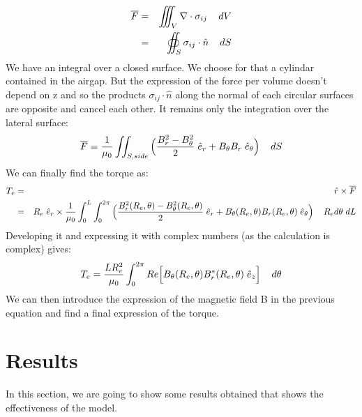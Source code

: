 \begin{eqnarray*}
\overline{F} &=& \iiint_V \nabla \cdot \sigma_{ij} \hspace{4mm} dV\\
 &=& \oiint_S \sigma_{ij} \cdot \hat{n} \hspace{4mm} dS
\end{eqnarray*}
We have an integral over a closed surface. We choose for that a cylindar contained in the airgap. But the expression of the force per volume doesn't depend on z and so the products $\sigma_{ij} \cdot \hat{n}$ along the normal of each circular surfaces are opposite and cancel each other. It remains only the integration over the lateral surface:
\[
    \overline{F} = \frac{1}{\mu_0} \iint_{S,side} \Big(\frac{B_{r}^{2}-B_{\theta}^{2}}{2}\hspace{1mm}  \hat{e}_{r}  + B_{\theta} B_{r}\hspace{1mm}  \hat{e}_{\theta}\Big) \hspace{4mm} dS
\]
We can finally find the torque as:
\begin{eqnarray*}
    T_e &=& \hat{r} \times \overline{F}\\
    &=& R_e \hspace{1mm}  \hat{e}_{r} \times \frac{1}{\mu_0} \int_{0}^{L} \int_{0}^{2 \pi}  \Big(\frac{B_{r}^{2}(R_e,\theta)-B_{\theta}^{2}(R_e,\theta)}{2}\hspace{1mm}  \hat{e}_{r}  + B_{\theta}(R_e,\theta) B_{r}(R_e,\theta)\hspace{1mm}  \hat{e}_{\theta}\Big) \hspace{4mm} R_e d\theta \hspace{1mm} dL
\end{eqnarray*}
Developing it and expressing it with complex numbers (as the calculation is complex) gives:
\begin{equation*}
    T_e = \frac{L R_{e}^{2}}{\mu_0} \int_{0}^{2 \pi}  Re \Big[B_{\theta}(R_e,\theta) B_{r}^{*}(R_e,\theta)\hspace{1mm}  \hat{e}_{z}\Big] \hspace{4mm} d\theta
\end{equation*}
We can then introduce the expression of the magnetic field B in the previous equation and find a final expression of the torque.
\section{Results}
In this section, we are going to show some results obtained that shows the effectiveness of the model.

